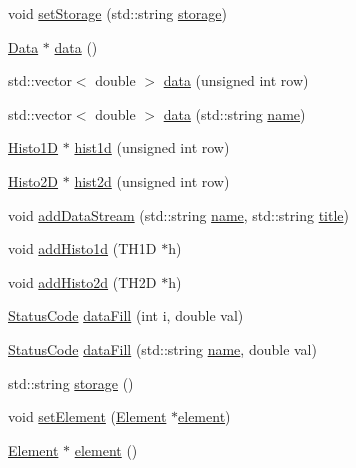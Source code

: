 \begin{DoxyCompactItemize}
void \hyperlink{classProcessus_ad57a29b33f9021eda9f6929136f1784f}{set\+Storage} (std\+::string \hyperlink{classProcessus_a33fa1a0b54a636e5cdd680669fd9ea51}{storage})
\item 
\hyperlink{classData}{Data} $\ast$ \hyperlink{classProcessus_a16e45f329fbce935aeef0ff3cb508228}{data} ()
\item 
std\+::vector$<$ double $>$ \hyperlink{classProcessus_aa7c57483cf4b9ab0b2d0ae2de8316402}{data} (unsigned int row)
\item 
std\+::vector$<$ double $>$ \hyperlink{classProcessus_abf4d91fb36707e1d50178bab12d21ae9}{data} (std\+::string \hyperlink{classObject_a300f4c05dd468c7bb8b3c968868443c1}{name})
\item 
\hyperlink{classHisto1D}{Histo1D} $\ast$ \hyperlink{classProcessus_a409227db936baff03c0462c1bcfe8069}{hist1d} (unsigned int row)
\item 
\hyperlink{classHisto2D}{Histo2D} $\ast$ \hyperlink{classProcessus_a73b5118cb5f2b5eaad33286183b86cfc}{hist2d} (unsigned int row)
\item 
void \hyperlink{classProcessus_a308c8f193802f1d1ab49d4447d0cb281}{add\+Data\+Stream} (std\+::string \hyperlink{classObject_a300f4c05dd468c7bb8b3c968868443c1}{name}, std\+::string \hyperlink{classObject_a73a0f1a41828fdd8303dd662446fb6c3}{title})
\item 
void \hyperlink{classProcessus_ad46e0d4dfdfdcbce001ee6be1746dfa4}{add\+Histo1d} (T\+H1D $\ast$h)
\item 
void \hyperlink{classProcessus_ac1ed1aed5edaeabdf18aa56775440471}{add\+Histo2d} (T\+H2D $\ast$h)
\item 
\hyperlink{classStatusCode}{Status\+Code} \hyperlink{classProcessus_a0d093b48f3218a088ba030e24372f18c}{data\+Fill} (int i, double val)
\item 
\hyperlink{classStatusCode}{Status\+Code} \hyperlink{classProcessus_aa31ab71711f7af6a729441ff573f69c9}{data\+Fill} (std\+::string \hyperlink{classObject_a300f4c05dd468c7bb8b3c968868443c1}{name}, double val)
\item 
std\+::string \hyperlink{classProcessus_a33fa1a0b54a636e5cdd680669fd9ea51}{storage} ()
\item 
void \hyperlink{classProcessus_a8ddef94227d83d9dae2cd49aebc33353}{set\+Element} (\hyperlink{classElement}{Element} $\ast$\hyperlink{classProcessus_a6fe155527431a7190b7d44d600b9608d}{element})
\item 
\hyperlink{classElement}{Element} $\ast$ \hyperlink{classProcessus_a6fe155527431a7190b7d44d600b9608d}{element} ()

\end{DoxyCompactItemize}
